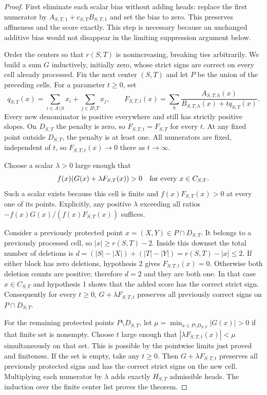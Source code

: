 \documentclass[11pt]{article}
\begin{document}
\begin{proof}
First eliminate each scalar bias without adding heads: replace the
first numerator by $A_{S,T,1}+c_{S,T}B_{S,T,1}$ and set the bias
to zero. This preserves affineness and the score exactly. This step
is necessary because an unchanged additive bias would not disappear
in the limiting suppression argument below.

Order the centers so that $r(S,T)$ is nonincreasing, breaking ties
arbitrarily. We build a sum $G$ inductively, initially zero, whose
strict signs are correct on every cell already processed. Fix the
next center $(S,T)$ and let $P$ be the union of the preceding cells.
For a parameter $t\geq0$, set
\[
 q_{S,T}(x)=\sum_{i\in A\setminus S}x_i+
                 \sum_{j\in B\setminus T}x_j,\qquad
 F_{S,T,t}(x)=\sum_h
 \frac{A_{S,T,h}(x)}{B_{S,T,h}(x)+tq_{S,T}(x)}.
\]
Every new denominator is positive everywhere and still has strictly
positive slopes. On $D_{S,T}$ the penalty is zero, so
$F_{S,T,t}=F_{S,T}$ for every $t$. At any fixed point outside
$D_{S,T}$, the penalty is at least one. All numerators are fixed,
independent of $t$, so $F_{S,T,t}(x)\to0$ there as $t\to\infty$.

Choose a scalar $\lambda>0$ large enough that
\[
 f(x)(G(x)+\lambda F_{S,T}(x))>0
 \quad\hbox{for every }x\in C_{S,T}.
\]
Such a scalar exists because this cell is finite and
$f(x)F_{S,T}(x)>0$ at every one of its points. Explicitly, any
positive $\lambda$ exceeding all ratios
$-f(x)G(x)/(f(x)F_{S,T}(x))$ suffices.

Consider a previously protected point $x=(X,Y)\in P\cap D_{S,T}$.
It belongs to a previously processed cell, so
$|x|\geq r(S,T)-2$. Inside this downset the total number of
deletions is
$d=(|S|-|X|)+(|T|-|Y|)=r(S,T)-|x|\leq2$.
If either block has zero deletions, hypothesis 2 gives
$F_{S,T,t}(x)=0$. Otherwise both deletion counts are positive;
therefore $d=2$ and they are both one. In that case
$x\in C_{S,T}$ and hypothesis 1 shows that the added score has
the correct strict sign. Consequently for every $t\geq0$,
$G+\lambda F_{S,T,t}$ preserves all previously correct signs on
$P\cap D_{S,T}$.

For the remaining protected points $P\setminus D_{S,T}$,
let $\mu=\min_{x\in P\setminus D_{S,T}}|G(x)|>0$ if that finite
set is nonempty. Choose $t$ large enough that
$|\lambda F_{S,T,t}(x)|<\mu$ simultaneously on that set.
This is possible by the pointwise limits just proved and finiteness.
If the set is empty, take any $t\geq0$. Then
$G+\lambda F_{S,T,t}$ preserves all previously protected signs
and has the correct strict signs on the new cell. Multiplying each
numerator by $\lambda$ adds exactly $H_{S,T}$ admissible heads.
The induction over the finite center list proves the theorem.
\end{proof}
\end{document}
